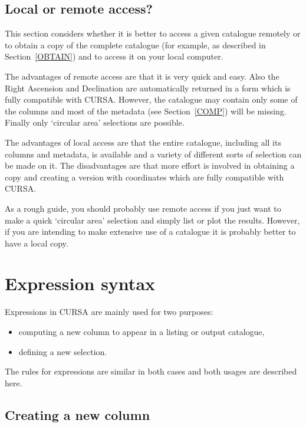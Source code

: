 \documentclass[twoside,11pt]{article}
\newcommand{\xlabel}[1]{}
\renewcommand{\_}{\texttt{\symbol{95}}}
\begin{document}
\subsection{Local or remote access?}

This section considers whether it is better to access a given catalogue
remotely or to obtain a copy of the complete catalogue (for example,
as described in Section~\ref{OBTAIN}) and to access it on your local
computer.

The advantages of remote access are that it is very quick and easy.
Also the Right Ascension and Declination are automatically returned in
a form which is fully compatible with CURSA.  However, the catalogue
may contain only some of the columns and most of the metadata (see
Section~\ref{COMP}) will be missing.  Finally only `circular area'
selections are possible.

The advantages of local access are that the entire catalogue, including all
its columns and metadata, is available and a variety of different sorts
of selection can be made on it.  The disadvantages are that more effort
is involved in obtaining a copy and creating a version with coordinates
which are fully compatible with CURSA.

As a rough guide, you should probably use remote access if you just want
to make a quick `circular area' selection and simply list or plot the
results.  However, if you are intending to make extensive use of a
catalogue it is probably better to have a local copy.


\newpage
\appendix

\section{\xlabel{EXPR}\label{EXPR}Expression syntax}

Expressions in CURSA are mainly used for two purposes:

\begin{itemize}

  \item computing a new column to appear in a listing or output
   catalogue,

  \item defining a new selection.

\end{itemize}

The rules for expressions are similar in both cases and both usages are
described here.

\subsection{Creating a new column}
\end{document}
